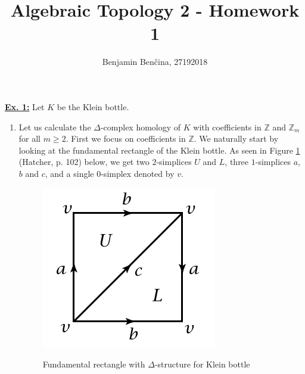 \documentclass[a4paper, 12pt]{article}
\title{Algebraic Topology 2 - Homework 1}
\author{Benjamin Benčina, 27192018}
\newcommand{\Z}{\mathbb{Z}}
\begin{document}
\maketitle

\underline{\textbf{Ex. 1:}}
Let $K$ be the Klein bottle.
\begin{enumerate}
	\item Let us calculate the $\Delta$-complex homology of $K$ with coefficients in $\Z$ and $\Z_m$ for all $m \geq 2$. First we focus on coefficients in $\Z$.
	We naturally start by looking at the fundamental rectangle of the Klein bottle. As seen in Figure \ref{fig:klein} (Hatcher, p. 102) below, we get two $2$-simplices $U$ and $L$, three $1$-simplices $a$, $b$ and $c$, and a single $0$-simplex denoted by $v$.
	\begin{figure}[h]
		\centering
		\includegraphics[scale=0.4]{klein.png}
		\label{fig:klein}
		\caption{Fundamental rectangle with $\Delta$-structure for Klein bottle}
	\end{figure}


\end{enumerate}
\end{document}
